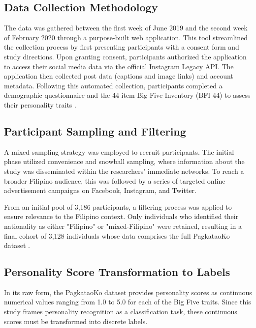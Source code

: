 \subsection{Data Collection Methodology}
The data was gathered between the first week of June 2019 and the second week of February 2020 through a purpose-built web application. This tool streamlined the collection process by first presenting participants with a consent form and study directions. Upon granting consent, participants authorized the application to access their social media data via the official Instagram Legacy API. The application then collected post data (captions and image links) and account metadata. Following this automated collection, participants completed a demographic questionnaire and the 44-item Big Five Inventory (BFI-44) to assess their personality traits \citep{tighe_acorda_2022}.

\subsection{Participant Sampling and Filtering}
A mixed sampling strategy was employed to recruit participants. The initial phase utilized convenience and snowball sampling, where information about the study was disseminated within the researchers' immediate networks. To reach a broader Filipino audience, this was followed by a series of targeted online advertisement campaigns on Facebook, Instagram, and Twitter.

From an initial pool of 3,186 participants, a filtering process was applied to ensure relevance to the Filipino context. Only individuals who identified their nationality as either "Filipino" or "mixed-Filipino" were retained, resulting in a final cohort of 3,128 individuals whose data comprises the full PagkataoKo dataset \citep{tighe_acorda_2022}.


\subsection{Personality Score Transformation to Labels}
In its raw form, the PagkataoKo dataset provides personality scores as continuous numerical values ranging from 1.0 to 5.0 for each of the Big Five traits. Since this study frames personality recognition as a classification task, these continuous scores must be transformed into discrete labels.

